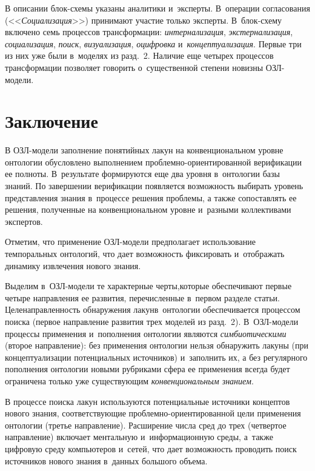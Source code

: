 {\begin{multicols}{2}
  В описании блок-схе\-мы указаны аналитики и~эксперты. В~операции 
согласования (<<\textit{Социализация}>>) принимают участие только 
эксперты. В~блок-схе\-му включено семь процессов трансформации: 
\textit{интернализация}, \textit{экстернализация}, \textit{социализация}, 
\textit{поиск}, \textit{визуализация}, \textit{оцифровка} 
и~\textit{концептуализация}. Первые три из них уже были в~моделях из разд.~2. 
Наличие еще четырех процессов трансформации позволяет говорить 
о~существенной степени новизны ОЗЛ-мо\-дели.

\section{Заключение}


  В ОЗЛ-модели заполнение понятийных лакун на конвенциональном уровне 
онтологии обуслов\-ле\-но выполнением проб\-лем\-но-ори\-ен\-ти\-ро\-ван\-ной 
верификации ее полноты. В~результате формируются еще два уровня 
в~онтологии базы знаний. По завершении верификации появляется 
возможность выбирать уровень представления знания в~процессе решения 
проблемы, а также сопоставлять ее решения, полученные на конвенциональном 
уровне и~разными коллективами экспертов. 

Отметим, что применение  
ОЗЛ-мо\-де\-ли предполагает использование темпоральных онтологий, что дает 
возможность фиксировать и~отображать динамику извлечения нового знания.
  
  Выделим в~ОЗЛ-мо\-де\-ли те характерные черты,\linebreak которые обеспечивают 
первые четыре направления ее развития, перечисленные в~первом разделе\linebreak 
\mbox{статьи}. 
%
Целенаправленность обнаружения лакун\linebreak в~онтологии обеспечивается 
процессом поиска (первое направление развития трех моделей из разд.~2). 
%
В~ОЗЛ-мо\-де\-ли процессы применения и~пополнения онтологии являются 
\textit{симбиотическими} (второе направление): без применения онтологии 
нельзя обнаружить лакуны (при концептуализации потенциальных источников) и~заполнить их, а без регулярного пополнения онтологии новыми рубриками 
сфера ее применения всегда будет ограничена только уже существующим 
\textit{конвенциональным знанием}.
  
  В процессе поиска лакун используются потенциальные источники концептов 
нового знания, соответствующие проб\-лем\-но-ори\-ен\-ти\-ро\-ван\-ной цели 
применения онтологии (третье направление). 
%
Расширение числа сред до трех 
(четвертое направление) включает ментальную и~информационную среды, 
а~также цифровую среду компьютеров и~сетей, что дает возможность 
проводить поиск источников нового знания в~данных большого объема.
  

\end{multicols}}
